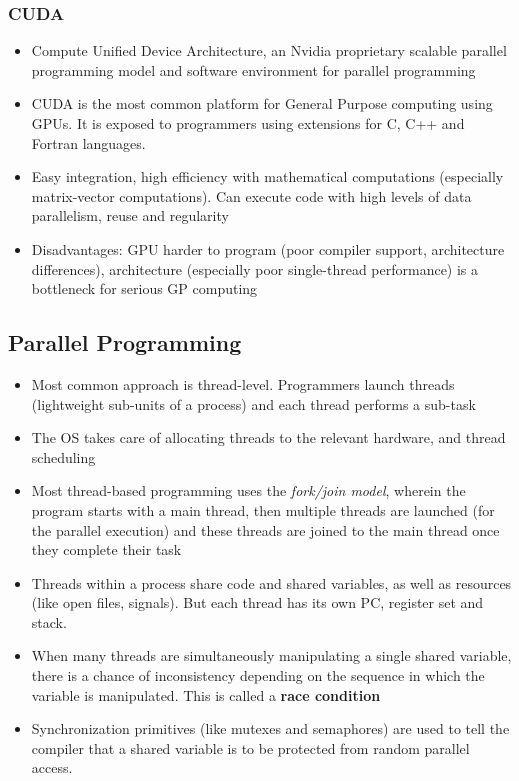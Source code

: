 \documentclass{article}
\begin{document}
\subsubsection{CUDA}
\begin{itemize}
    \item Compute Unified Device Architecture, an Nvidia proprietary scalable parallel programming model and software environment for parallel programming
    
    \item CUDA is the most common platform for General Purpose computing using GPUs. It is exposed to programmers using extensions for C, C++ and Fortran languages.
    
    \item Easy integration, high efficiency with mathematical computations (especially matrix-vector computations). Can execute code with high levels of data parallelism, reuse and regularity
    
    \item Disadvantages: GPU harder to program (poor compiler support, architecture differences), architecture (especially poor single-thread performance) is a bottleneck for serious GP computing
\end{itemize}

\subsection{Parallel Programming}
\begin{itemize}
    \item Most common approach is thread-level. Programmers launch threads (lightweight sub-units of a process) and each thread performs a sub-task
    
    \item The OS takes care of allocating threads to the relevant hardware, and thread scheduling 
    
    \item Most thread-based programming uses the \textit{fork/join model}, wherein the program starts with a main thread, then multiple threads are launched (for the parallel execution) and these threads are joined to the main thread once they complete their task
    
    \item Threads within a process share code and shared variables, as well as resources (like open files, signals). But each thread has its own PC, register set and stack. 
    
    \item When many threads are simultaneously manipulating a single shared variable, there is a chance of inconsistency depending on the sequence in which the variable is manipulated. This is called a \textbf{race condition}
    
    \item Synchronization primitives (like mutexes and semaphores) are used to tell the compiler that a shared variable is to be protected from random parallel access. 
\end{itemize}
\end{document}
